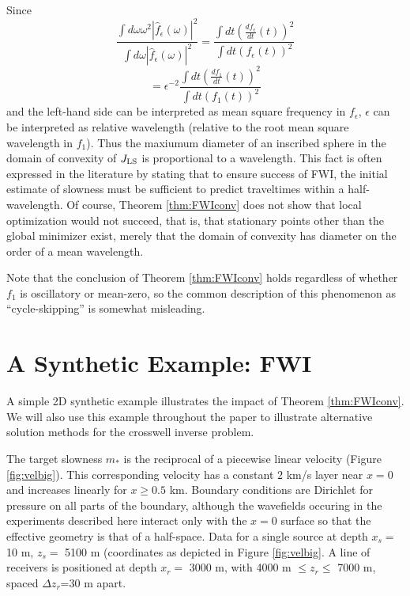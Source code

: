 \begin{rem} Since 
\[
\frac{\int d\omega \omega^2 |\hat{f}_{\epsilon}(\omega)|^2}{\int
  d\omega |\hat{f}_{\epsilon}(\omega)|^2}
= \frac{\int dt \left(\frac{df_{\epsilon}}{dt}(t)\right)^2}{\int dt
  \left(f_{\epsilon}(t)\right)^2}
\]
\[
=\epsilon^{-2}\frac{\int dt \left(\frac{df_{1}}{dt}(t)\right)^2}{\int dt
  \left(f_{1}(t)\right)^2}
\]
and the left-hand side can be interpreted as mean square frequency in
$f_{\epsilon}$, $\epsilon$ can be interpreted as relative wavelength
(relative to the root mean square wavelength in $f_1$). Thus the maxiumum
diameter of an inscribed sphere in the domain of convexity of $J_{\rm
  LS}$ is proportional to a wavelength. This fact is often expressed
in the literature by stating that to ensure success of FWI, the
initial estimate of slowness must be sufficient to predict traveltimes
within a half-wavelength. Of course, Theorem \ref{thm:FWIconv} does not show that
local optimization would not succeed, that is, that stationary points
other than the global minimizer exist, merely that the domain of
convexity has diameter on the order of a mean wavelength. 

Note that the conclusion of Theorem \ref{thm:FWIconv} holds regardless of whether
$f_1$ is oscillatory or mean-zero, so the common description of this
phenomenon as ``cycle-skipping'' is somewhat misleading.
\end{rem}

\section{A Synthetic Example: FWI}
A simple 2D synthetic example illustrates the impact of Theorem
\ref{thm:FWIconv}. We will also use this example throughout the paper
to illustrate alternative solution methods for the crosswell inverse
problem.

The target slowness $m_*$ is the reciprocal of a piecewise
linear velocity (Figure
\ref{fig:velbig}). This corresponding velocity has a constant $2$ km/s layer near $x=0$ and
increases linearly for $x\ge 0.5$ km. Boundary conditions are Dirichlet
for pressure on all parts of the boundary, although the wavefields
occuring in the experiments described here interact only with the $x=0$
surface so that the effective geometry is that of a half-space. Data
for a single source at depth $x_s=$ 10 m, $z_s=$ 5100 m (coordinates as
depicted in Figure \ref{fig:velbig}. A line of receivers is positioned
at depth $x_r=$ 3000 m, with 4000 m $\le z_r \le$ 7000 m, spaced
$\Delta z_r$=30 m apart. 

